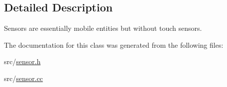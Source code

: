 \subsection{Detailed Description}
Sensors are essentially mobile entities but without touch sensors. 

The documentation for this class was generated from the following files\+:\begin{DoxyCompactItemize}
\item 
src/\hyperlink{sensor_8h}{sensor.\+h}\item 
src/\hyperlink{sensor_8cc}{sensor.\+cc}\end{DoxyCompactItemize}
